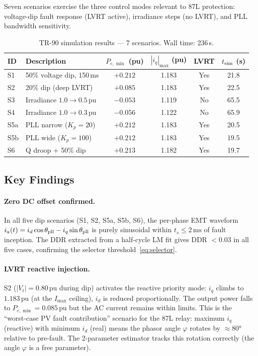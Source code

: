 \documentclass[11pt, a4paper]{article}
\begin{document}
Seven scenarios exercise the three control modes relevant to 87L protection:
voltage-dip fault response (LVRT active), irradiance steps (no LVRT), and
PLL bandwidth sensitivity.

\begin{table}[!t]
\centering
\caption{TR-90 simulation results — 7 scenarios.  Wall time: 236\,s.}
\label{tab:emt_results}
\renewcommand{\arraystretch}{1.10}
\begin{tabular}{llcccc}
\toprule
ID  & Description                       & $P_{e,\min}$ (pu) & $|i_q|_{\max}$ (pu) & LVRT & $t_{\rm sim}$ (s) \\
\midrule
S1  & 50\% voltage dip, 150\,ms         & $+0.212$ & 1.183 & Yes & 21.8 \\
S2  & 20\% dip (deep LVRT)              & $+0.085$ & 1.183 & Yes & 22.5 \\
S3  & Irradiance $1.0 \to 0.5\,\text{pu}$ & $-0.053$ & 1.119 & No  & 65.5 \\
S4  & Irradiance $1.0 \to 0.3\,\text{pu}$ & $-0.056$ & 1.122 & No  & 65.9 \\
S5a & PLL narrow ($K_p = 20$)           & $+0.212$ & 1.183 & Yes & 20.5 \\
S5b & PLL wide   ($K_p = 100$)          & $+0.212$ & 1.183 & Yes & 19.5 \\
S6  & Q droop + 50\% dip                & $+0.213$ & 1.182 & Yes & 19.7 \\
\bottomrule
\end{tabular}
\end{table}

\subsection{Key Findings}

\paragraph{Zero DC offset confirmed.}
In all five dip scenarios (S1, S2, S5a, S5b, S6), the per-phase EMT waveform
$i_a(t) = i_d \cos\theta_{\rm pll} - i_q\sin\theta_{\rm pll}$ is purely
sinusoidal within $t_s \leq 2\,\text{ms}$ of fault inception.  The DDR
extracted from a half-cycle LM fit gives DDR $< 0.03$ in all five cases,
confirming the selector threshold~\eqref{eq:selector}.

\paragraph{LVRT reactive injection.}
S2 ($|V_t| = 0.80\,\text{pu}$ during dip) activates the reactive priority
mode: $i_q$ climbs to $1.183\,\text{pu}$ (at the $I_{\max}$ ceiling),
$i_d$ is reduced proportionally.  The output power falls to $P_{e,\min} = 0.085\,\text{pu}$
but the AC current remains within limits.  This is the ``worst-case PV fault
contribution'' scenario for the 87L relay: maximum $i_q$ (reactive) with
minimum $i_d$ (real) means the phasor angle $\varphi$ rotates by $\approx 80°$
relative to pre-fault.  The 2-parameter estimator tracks this rotation correctly
(the angle $\varphi$ is a free parameter).
\end{document}
